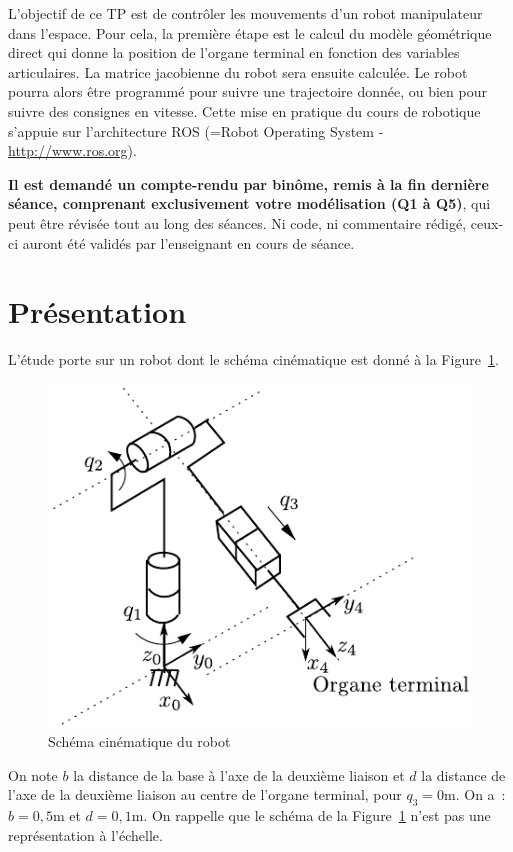 \documentclass[12pt,a4paper]{article}
\begin{document}
\graphicspath{{figs/}}

\vspace{1cm}
\begin{center}
\end{center}

\bigskip


\hspace{12pt} L'objectif de ce TP est de contrôler les mouvements d'un robot manipulateur dans l'espace. Pour cela, la première étape est le calcul du modèle géométrique direct qui donne la position de l'organe terminal en fonction des variables articulaires.  La matrice jacobienne du robot sera ensuite calculée. Le robot pourra alors être programmé pour suivre une trajectoire donnée, ou bien pour suivre des consignes en vitesse. Cette mise en pratique du cours de robotique s'appuie sur l'architecture ROS (=Robot Operating System - \url{http://www.ros.org}). 

\medskip

\textbf{Il est demandé un compte-rendu par binôme, remis à la fin dernière séance,  comprenant   exclusivement votre modélisation (Q1 à Q5)}, qui peut être révisée tout au long des séances. Ni code, ni commentaire rédigé, ceux-ci auront été validés par l'enseignant en cours de séance.


\section{Présentation}

\medskip 

L'étude porte sur un robot dont le schéma cinématique  est donné à la Figure~\ref{fig:2RP}. 
\begin{figure}[h]
\centering
\includegraphics[width=.48\linewidth]{fig-tourelle.pdf}
\caption{Schéma cinématique du robot}
\label{fig:2RP}
\end{figure}

\noindent On note $b$ la distance de la base à l'axe de la deuxième liaison et  $d$ la distance de l'axe de la deuxième liaison au centre de l'organe terminal, pour $q_3=0$m. On a~: $b=0,5$m et  $d=0,1$m. On rappelle que le schéma de la Figure~\ref{fig:2RP} n'est pas une représentation à l'échelle.
\end{document}
